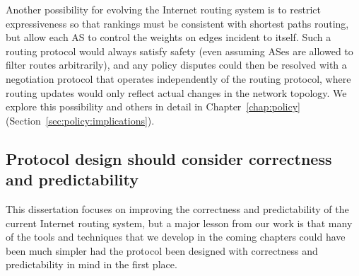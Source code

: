 Another possibility for evolving the Internet routing system is to
restrict expressiveness so that rankings must be consistent with
shortest paths routing, but allow each AS to control the weights on
edges incident to itself.  Such a routing protocol would always
satisfy safety (even assuming ASes are allowed to filter routes
arbitrarily), and any
policy disputes could then be resolved with a negotiation protocol that
operates independently of the routing protocol, where routing updates
would only reflect actual changes in the network topology.  We explore
this possibility and others in detail in
Chapter~\ref{chap:policy} (Section~\ref{sec:policy:implications}).
 

\subsection{Protocol design should consider correctness and
predictability}\label{sec:mods} 

This dissertation focuses on improving the correctness and
predictability of the current Internet routing system, but a major
lesson from our work is that many of the tools and techniques that we
develop in the coming chapters could have been much simpler had the
protocol been designed with correctness and predictability in mind in
the first place.  


